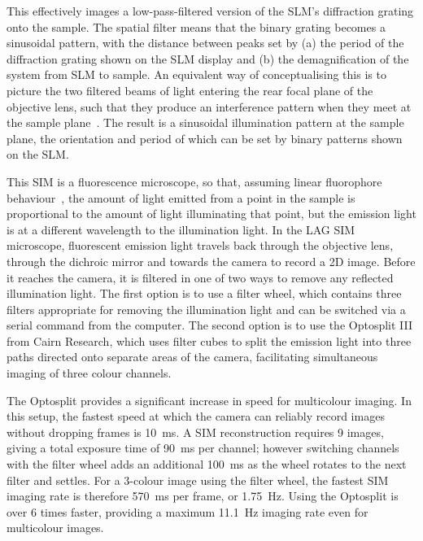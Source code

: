 This effectively images a low-pass-filtered version of the SLM's diffraction grating onto the sample.
The spatial filter means that the binary grating becomes a sinusoidal pattern, with the distance between peaks set by (a) the period of the diffraction grating shown on the SLM display and (b) the demagnification of the system from SLM to sample.
An equivalent way of conceptualising this is to picture the two filtered beams of light entering the rear focal plane of the objective lens, such that they produce an interference pattern when they meet at the sample plane~\cite[\textit{ch. 9}]{hecht2017optics}.
The result is a sinusoidal illumination pattern at the sample plane, the orientation and period of which can be set by binary patterns shown on the SLM.

This SIM is a fluorescence microscope, so that, assuming linear fluorophore behaviour~\cite{gustafsson2005nonlinear, shen1984principles}, the amount of light emitted from a point in the sample is proportional to the amount of light illuminating that point, but the emission light is at a different wavelength to the illumination light.
In the LAG SIM microscope, fluorescent emission light travels back through the objective lens, through the dichroic mirror and towards the camera to record a 2D image.
Before it reaches the camera, it is filtered in one of two ways to remove any reflected illumination light.
The first option is to use a filter wheel, which contains three filters appropriate for removing the illumination light and can be switched via a serial command from the computer.
The second option is to use the Optosplit III from Cairn Research, which uses filter cubes to split the emission light into three paths directed onto separate areas of the camera, facilitating simultaneous imaging of three colour channels.

The Optosplit provides a significant increase in speed for multicolour imaging.
In this setup, the fastest speed at which the camera can reliably record images without dropping frames is \SI{10}{\milli\second}.
A SIM reconstruction requires 9 images, giving a total exposure time of \SI{90}{\milli\second} per channel; however switching channels with the filter wheel adds an additional \SI{100}{\milli\second} as the wheel rotates to the next filter and settles.
For a 3-colour image using the filter wheel, the fastest SIM imaging rate is therefore \SI{570}{\milli\second} per frame, or \SI{1.75}{\hertz}.
Using the Optosplit is over 6 times faster, providing a maximum \SI{11.1}{\hertz} imaging rate even for multicolour images.

